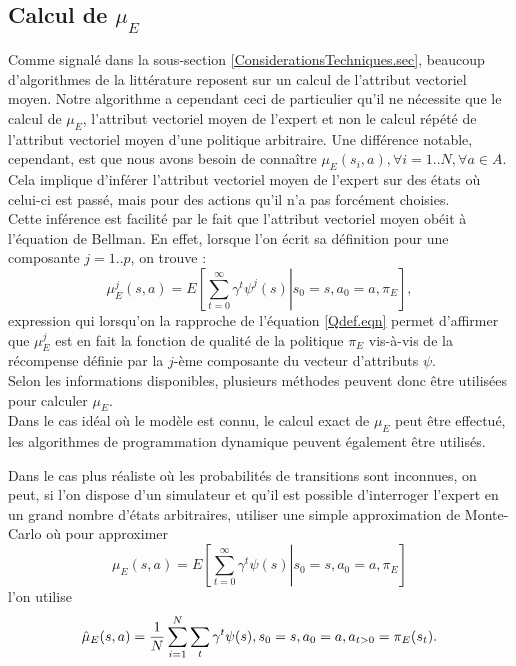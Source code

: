 \documentclass[publibook-draft]{CAp2012}
\begin{document}
\subsection{Calcul de $\mu_E$}
\label{calculmu.sec}
Comme signalé dans la sous-section \ref{ConsiderationsTechniques.sec}, beaucoup d'algorithmes de la littérature reposent sur un calcul de l'attribut vectoriel moyen. Notre algorithme a cependant ceci de particulier qu'il ne nécessite que le calcul de $\mu_E$, l'attribut vectoriel moyen de l'expert et non le calcul répété de l'attribut vectoriel moyen d'une politique arbitraire. Une différence notable, cependant, est que nous avons besoin de connaître $\mu_E(s_i,a), \forall i= 1..N,\forall a \in A$. Cela implique d'inférer l'attribut vectoriel moyen de l'expert sur des états où celui-ci est passé, mais pour des actions qu'il n'a pas forcément choisies.\\ %

Cette inférence est facilité par le fait que l'attribut vectoriel moyen obéit à l'équation de Bellman. En effet, lorsque l'on écrit sa définition pour une composante $j=1..p$, on trouve :
\begin{equation}
\mu_E^j(s,a) = E\left.\left[\sum\limits_{t=0}^\infty \gamma^t \psi^j(s)\right|s_0 = s, a_0 = a, \pi_E\right],
\end{equation}
expression qui lorsqu'on la rapproche de l'équation \eqref{Qdef.eqn} permet d'affirmer que $\mu^j_E$ est en fait la fonction de qualité de la politique $\pi_E$ vis-à-vis de la récompense définie par la $j$-ème composante du vecteur d'attributs $\psi$.\\

Selon les informations disponibles, plusieurs méthodes peuvent donc être utilisées pour calculer $\mu_E$.\\

Dans le cas idéal où le modèle est connu, le calcul exact de $\mu_E$ peut être effectué, les algorithmes de programmation dynamique peuvent également être utilisés.

Dans le cas plus réaliste où les probabilités de transitions sont inconnues, on peut, si l'on dispose d'un simulateur et qu'il est possible d'interroger l'expert en un grand nombre d'états arbitraires, utiliser une simple approximation de Monte-Carlo où pour approximer
\begin{equation}
\mu_E(s,a) = E\left.\left[\sum\limits_{t=0}^\infty \gamma^t \psi(s)\right|s_0 = s, a_0 = a, \pi_E\right]
\end{equation}
 l'on utilise
\begin{equation}
\hat\mu_E(s,a) = {1\over N}\sum\limits_{i=1}^{N}\sum\limits_{t}\gamma^t\psi(s), s_0=s, a_0=a, a_{t>0} = \pi_E(s_t).
\end{equation}
\end{document}
